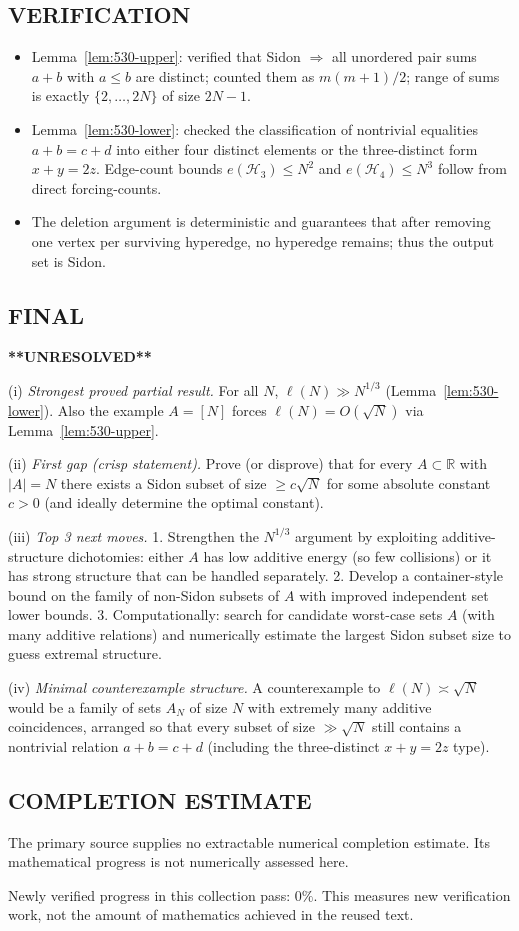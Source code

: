 \subsection*{VERIFICATION}
\begin{itemize}
\item Lemma~\ref{lem:530-upper}: verified that Sidon $\Rightarrow$ all unordered pair sums $a+b$ with $a\le b$ are distinct; counted them as $m(m+1)/2$; range of sums is exactly $\{2,\dots,2N\}$ of size $2N-1$.
\item Lemma~\ref{lem:530-lower}: checked the classification of nontrivial equalities $a+b=c+d$ into either four distinct elements or the three-distinct form $x+y=2z$. Edge-count bounds $e(\mathcal H_3)\le N^2$ and $e(\mathcal H_4)\le N^3$ follow from direct forcing-counts.
\item The deletion argument is deterministic and guarantees that after removing one vertex per surviving hyperedge, no hyperedge remains; thus the output set is Sidon.
\end{itemize}

\subsection*{FINAL}
\textbf{**UNRESOLVED**}

(i) \emph{Strongest proved partial result.} For all $N$, $\ell(N)\gg N^{1/3}$ (Lemma~\ref{lem:530-lower}). Also the example $A=[N]$ forces $\ell(N)=O(\sqrt N)$ via Lemma~\ref{lem:530-upper}.

(ii) \emph{First gap (crisp statement).} Prove (or disprove) that for every $A\subset\mathbb R$ with $|A|=N$ there exists a Sidon subset of size $\ge c\sqrt N$ for some absolute constant $c>0$ (and ideally determine the optimal constant).

(iii) \emph{Top 3 next moves.}
1. Strengthen the $N^{1/3}$ argument by exploiting additive-structure dichotomies: either $A$ has low additive energy (so few collisions) or it has strong structure that can be handled separately.
2. Develop a container-style bound on the family of non-Sidon subsets of $A$ with improved independent set lower bounds.
3. Computationally: search for candidate worst-case sets $A$ (with many additive relations) and numerically estimate the largest Sidon subset size to guess extremal structure.

(iv) \emph{Minimal counterexample structure.} A counterexample to $\ell(N)\asymp \sqrt N$ would be a family of sets $A_N$ of size $N$ with extremely many additive coincidences, arranged so that every subset of size $\gg \sqrt N$ still contains a nontrivial relation $a+b=c+d$ (including the three-distinct $x+y=2z$ type).




\subsection*{COMPLETION ESTIMATE}
The primary source supplies no extractable numerical completion estimate. Its mathematical progress is not numerically assessed here.

Newly verified progress in this collection pass: $0\%$. This measures new verification work, not the amount of mathematics achieved in the reused text.
